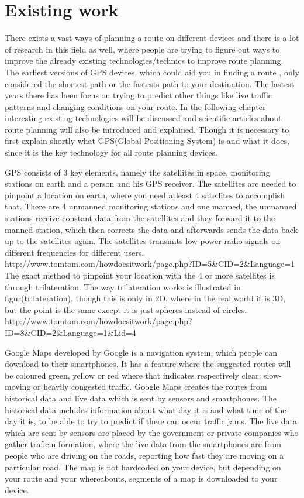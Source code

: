 \section{Existing work}
There exists a vast ways of planning a route on different devices and there is  a lot of research in this field as well, where people are trying to figure out ways to improve the already existing technologies/technics to improve route planning. The earliest versions of GPS devices, which could aid you in finding a route , only considered the shortest path or the fastests path to your destination. 
The lastest years there has been focus on trying to predict other things like live traffic patterns and changing conditions on your route.
In the following chapter interesting existing technologies will be discussed and scientific articles about route planning will also be introduced and explained. Though it is necessary to first explain shortly what GPS(Global Positioning System) is and what it does, since it is the key technology for all route planning devices.

GPS consists of 3 key elements, namely the satellites in space, monitoring stations on earth and a person and his GPS receiver. The satellites are needed to pinpoint a location on earth, where you need atleast 4 satellites to accomplish that. 
There are 4 unmanned monitoring stations and one manned, the unmanned stations receive constant data from the satellites and they forward it to the manned station, which then corrects the data and afterwards sends the data back up to the satellites  again. The satellites transmits low power radio signals on different frequencies for different users.
http://www.tomtom.com/howdoesitwork/page.php?ID=5\&CID=2\&Language=1
The exact method to pinpoint your location with the 4 or more satellites is through trilateration. The way trilateration works is illustrated in figur(trilateration), though this is only in 2D, where in the real world it is 3D, but the point is the same except it is just spheres instead of circles.
http://www.tomtom.com/howdoesitwork/page.php?ID=8\&CID=2\&Language=1\&Lid=4


Google Maps developed by Google is a navigation system, which people can download to their smartphones. It has a feature where the suggested routes will be coloured green, yellow or red where that indicates respectively clear, slow-moving or heavily congested traffic. 
Google Maps creates the routes from historical data and live data which is sent by sensors and smartphones. The historical data includes information about what day it is and what time of the day it is, to be able to try to predict if there can occur traffic jams. The live data which are sent by sensors are placed by the government or private companies who gather traficin formation, where the live data from the smartphones are from people who are driving on the roads, reporting how fast they are moving on a particular road. The map is not hardcoded on your device, but depending on your route and your whereabouts, segments of a map is downloaded to your device.

